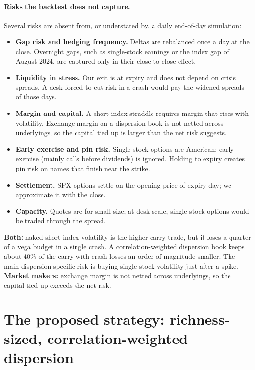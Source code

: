 \paragraph{Risks the backtest does not capture.} Several risks are absent from, or understated by, a daily end-of-day simulation:
\begin{itemize}
  \item \textbf{Gap risk and hedging frequency.} Deltas are rebalanced once a day at the close. Overnight gaps, such as single-stock earnings or the index gap of August 2024, are captured only in their close-to-close effect.
  \item \textbf{Liquidity in stress.} Our exit is at expiry and does not depend on crisis spreads. A desk forced to cut risk in a crash would pay the widened spreads of those days.
  \item \textbf{Margin and capital.} A short index straddle requires margin that rises with volatility. Exchange margin on a dispersion book is not netted across underlyings, so the capital tied up is larger than the net risk suggests.
  \item \textbf{Early exercise and pin risk.} Single-stock options are American; early exercise (mainly calls before dividends) is ignored. Holding to expiry creates pin risk on names that finish near the strike.
  \item \textbf{Settlement.} SPX options settle on the opening price of expiry day; we approximate it with the close.
  \item \textbf{Capacity.} Quotes are for small size; at desk scale, single-stock options would be traded through the spread.
\end{itemize}

\begin{desk}
\textbf{Both:} naked short index volatility is the higher-carry trade, but it loses a quarter of a vega budget in a single crash. A correlation-weighted dispersion book keeps about 40\% of the carry with crash losses an order of magnitude smaller. The main dispersion-specific risk is buying single-stock volatility just after a spike. \textbf{Market makers:} exchange margin is not netted across underlyings, so the capital tied up exceeds the net risk.
\end{desk}

\section{The proposed strategy: richness-sized, correlation-weighted dispersion}\label{sec:timing}

